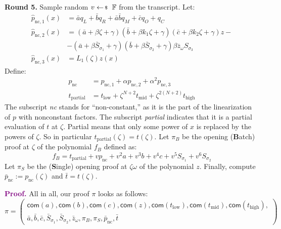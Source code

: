 \documentclass[../../book.tex]{subfiles}
\begin{document}
\textcolor{green!60!black}{\textbf{Round 5.}} Sample random $v \leftarrowS
\mathbb{F}$ from the transcript. Let:
\begin{equation*}    
    \begin{aligned}
        \hat{p}_{\text{nc},1}(x) &= \bar{a}q_L + \bar{b}q_R + \bar{a}\bar{b}q_M + \bar{c}q_O + q_C \\
        \hat{p}_{\text{nc},2}(x) &= (\bar{a} + \beta \zeta + \gamma)(\bar{b} + \beta k_1 \zeta + \gamma)(\bar{c} + \beta k_2 \zeta + \gamma) z - \\
                                 &- (\bar{a} + \beta \bar{S}_{\sigma_1} + \gamma)(\bar{b} + \beta \bar{S}_{\sigma_2} + \gamma)\beta \overline{z}_{\omega}S_{\sigma_3} \\
        \hat{p}_{\text{nc},3}(x) &= L_1(\zeta)z(x)
    \end{aligned}
\end{equation*}
Define:
\begin{align*}
p_{\text{nc}} &= p_{\text{nc},1} + \alpha p_{\text{nc}, 2} + \alpha^2 p_{\text{nc}, 3} \\
t_{\text{partial}} &= t_{\text{low}} + \zeta^{N+2}t_{\text{mid}} + \zeta^{2(N+2)}t_{\text{high}}
\end{align*}
The subscript \emph{nc} stands for ``non-constant,'' as it is the part of the
linearization of $p$ with nonconstant factors. The subscript \emph{partial} indicates
that it is a partial evaluation of $t$ at $\zeta$. Partial means that only some
power of $x$ is replaced by the powers of $\zeta$. So in particular
$t_{\text{partial}}(\zeta) = t(\zeta)$. Let $\pi_B$ be the opening (\textbf{B}atch) proof at
$\zeta$ of the polynomial $f_B$ defined as: 
\[
f_B = t_{\text{partial}} + v p_{\text{nc}} + v^2 a + v^3 b + v^4 c + v^5 S_{\sigma_1} + v^6 S_{\sigma_2}
\]
Let $\pi_{S}$ be the (\textbf{S}ingle) opening proof at $\zeta\omega$ of the polynomial
$z$. Finally, compute $\bar{p}_{\text{nc}} := p_{\text{nc}}(\zeta)$ and $\bar{t} = t(\zeta)$.

\textcolor{purple}{\textbf{Proof.}} All in all, our proof $\pi$ looks as follows:
\begin{equation*}
    \pi = \begin{pmatrix}\mathsf{com}(a), \mathsf{com}(b), \mathsf{com}(c), \mathsf{com}(z), \mathsf{com}(t_{\text{low}}), \mathsf{com}(t_{\text{mid}}), \mathsf{com}(t_{\text{high}}), \\
        \bar{a}, \bar{b}, \bar{c}, \bar{S}_{\sigma_1}, \bar{S}_{\sigma_2}, \bar{z}_{\omega}, \pi_{B}, \pi_{S}, \bar{p}_{\text{nc}}, \bar{t}
    \end{pmatrix}
\end{equation*}
\end{document}
